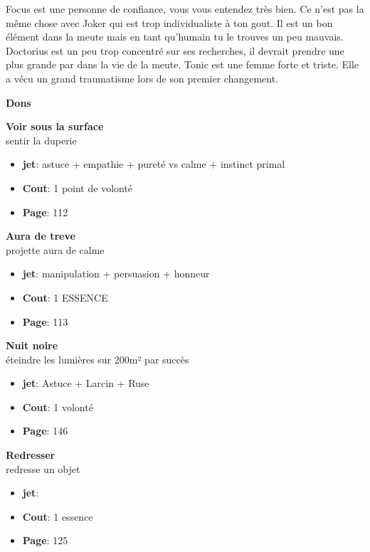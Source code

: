 \documentclass[oneside,12pt]{book}
\newcommand\don[5]{
\textbf{#1} \\
#2
\begin{itemize}
\item{ \textbf{jet}: #3}
\item{ \textbf{Cout}: #4}
\item{ \textbf{Page}: #5}
\end{itemize}
\vspace{0.5cm}
}
\begin{document}
\begin{flushleft}
\begin{description}
{Focus est une personne de confiance, vous vous entendez très bien. Ce n'est pas la même chose avec Joker qui est trop individualiste à ton gout. Il est un bon élément dans la meute mais en tant qu'humain tu le trouves un peu mauvais. 
Doctorius est un peu trop concentré sur ses recherches, il devrait prendre une plus grande par dans la vie de la meute.  
Tonic est une femme forte et triste. Elle a vécu un grand traumatisme lors de son premier changement. 
}
\end{description}
\clearpage
\textbf{\large Dons} 
\vspace{0.5cm}

\don{Voir sous la surface}{sentir la duperie}{astuce + empathie + pureté vs calme + instinct primal}{1 point de volonté}{112}
\don{Aura de treve}{projette aura de calme}{manipulation + persuasion + honneur}{1 ESSENCE}{113}
\don{Nuit noire}{éteindre les lumières sur 200m² par succès}{Astuce + Larcin + Ruse}{1 volonté}{146}
\don{Redresser}{redresse un objet }{}{1 essence}{125}

\clearpage

\end{flushleft}
\end{document}
